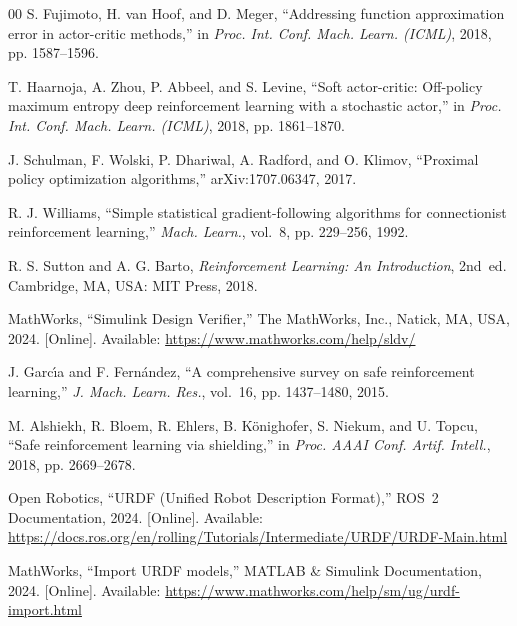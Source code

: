 \documentclass{ieeeaccess}
\begin{document}
\begin{thebibliography}{00}
S. Fujimoto, H. van Hoof, and D. Meger, ``Addressing function approximation error in actor-critic methods,'' in \emph{Proc. Int. Conf. Mach. Learn. (ICML)}, 2018, pp. 1587--1596.



T. Haarnoja, A. Zhou, P. Abbeel, and S. Levine, ``Soft actor-critic: Off-policy maximum entropy deep reinforcement learning with a stochastic actor,'' in \emph{Proc. Int. Conf. Mach. Learn. (ICML)}, 2018, pp. 1861--1870.



J. Schulman, F. Wolski, P. Dhariwal, A. Radford, and O. Klimov, ``Proximal policy optimization algorithms,'' arXiv:1707.06347, 2017.



R. J. Williams, ``Simple statistical gradient-following algorithms for connectionist reinforcement learning,'' \emph{Mach. Learn.}, vol.~8, pp. 229--256, 1992.



R. S. Sutton and A. G. Barto, \emph{Reinforcement Learning: An Introduction}, 2nd~ed. Cambridge, MA, USA: MIT Press, 2018.



MathWorks, ``Simulink Design Verifier,'' The MathWorks, Inc., Natick, MA, USA, 2024. [Online]. Available: \url{https://www.mathworks.com/help/sldv/}



J. Garc{\'\i}a and F. Fern{\'a}ndez, ``A comprehensive survey on safe reinforcement learning,'' \emph{J. Mach. Learn. Res.}, vol.~16, pp. 1437--1480, 2015.



M. Alshiekh, R. Bloem, R. Ehlers, B. K{\"o}nighofer, S. Niekum, and U. Topcu, ``Safe reinforcement learning via shielding,'' in \emph{Proc. AAAI Conf. Artif. Intell.}, 2018, pp. 2669--2678.



Open Robotics, ``URDF (Unified Robot Description Format),'' ROS~2 Documentation, 2024. [Online]. Available: \url{https://docs.ros.org/en/rolling/Tutorials/Intermediate/URDF/URDF-Main.html}



MathWorks, ``Import URDF models,'' MATLAB \& Simulink Documentation, 2024. [Online]. Available: \url{https://www.mathworks.com/help/sm/ug/urdf-import.html}




\end{thebibliography}
\end{document}
